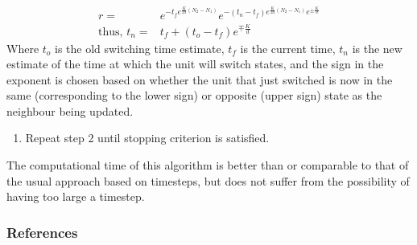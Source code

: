 \documentclass{beamer}
\newcounter{saveenumi}
\newcommand{\seti}{\setcounter{saveenumi}{\value{enumi}}}
\newcommand{\conti}{\setcounter{enumi}{\value{saveenumi}}}
\begin{document}
\begin{frame}

\begin{align}\label{updt}
r=&e^{-t_fe^{\frac{K}{2d}(N_2-N_1)}}e^{-(t_n-t_f)e^{\frac{K}{2d}(N_2-
N_1)}e^{\pm\frac{K}{d}}}\nonumber\\\text{thus, }t_n=&t_f+(t_o-t_f)e^{
\mp\frac{K}{d}}
\end{align}
Where $t_o$ is the old switching time estimate, $t_f$ is the current
time, $t_n$ is the new estimate of the time at which the unit will
switch states, and the sign in the exponent is chosen based on whether
the unit that just switched is now in the same (corresponding to the
lower sign) or opposite (upper sign) state as the neighbour being
updated.
\begin{enumerate}
\conti
\item Repeat step 2 until stopping criterion is satisfied.
\end{enumerate}
The computational time of this algorithm is better than or comparable to
that of the usual approach based on timesteps, but does not suffer from
the possibility of having too large a timestep.
\end{frame}
\begin{frame}
\frametitle{References}


\end{frame}
\end{document}
